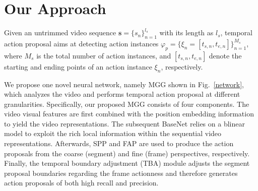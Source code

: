 \documentclass[10pt,twocolumn,letterpaper]{article}
\begin{document}
\section{Our Approach}
\label{sec:approach}

Given an untrimmed video sequence $\textbf{s}=\{s_n\}^{l_s}_{n=1}$ with its length as $l_s$, temporal action proposal aims at detecting action instances $\varphi_{p}=\{\xi_{n}=[t_{s,n},t_{e,n}] \}_{n=1}^{M_{s}} $, where 
$M_{s}$ is the total number of action instances, and  $[t_{s,n},t_{e,n}]$ denote the starting and ending points of an action instance $\xi_{n}$, respectively.    

We propose one novel neural network, namely MGG shown in Fig.~\ref{network}, which analyzes the video and performs temporal action proposal at different granularities. Specifically, our proposed MGG consists of four components. The video visual features are first combined with the position embedding information to yield the video representations.  The subsequent BaseNet relies on a blinear model to exploit the rich local information within the sequential video representations. Afterwards, SPP and FAP are used to produce the action proposals from the coarse (segment) and fine (frame) perspectives, respectively. Finally, the temporal boundary adjustment (TBA) module adjusts the segment proposal boundaries regarding the frame actionness and therefore generates action proposals of both high recall and precision.
\end{document}
